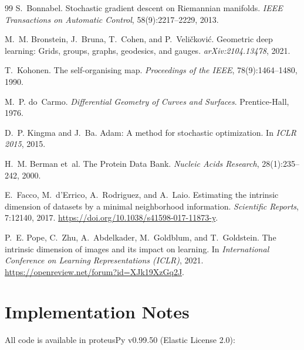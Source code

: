 \documentclass[12pt,letterpaper]{article}
\begin{document}
\begin{thebibliography}{99}
S.~Bonnabel.
\newblock Stochastic gradient descent on {Riemannian} manifolds.
\newblock \emph{IEEE Transactions on Automatic Control}, 58(9):2217--2229, 2013.

M.~M. Bronstein, J.~Bruna, T.~Cohen, and P.~Veli\v{c}kovi\'{c}.
\newblock Geometric deep learning: Grids, groups, graphs, geodesics, and
  gauges.
\newblock \emph{arXiv:2104.13478}, 2021.

T.~Kohonen.
\newblock The self-organising map.
\newblock \emph{Proceedings of the IEEE}, 78(9):1464--1480, 1990.

M.~P. do~Carmo.
\newblock \emph{Differential Geometry of Curves and Surfaces}.
\newblock Prentice-Hall, 1976.

D.~P. Kingma and J.~Ba.
\newblock Adam: A method for stochastic optimization.
\newblock In \emph{ICLR 2015}, 2015.

H.~M. Berman et~al.
\newblock The {Protein Data Bank}.
\newblock \emph{Nucleic Acids Research}, 28(1):235--242, 2000.

E.~Facco, M.~d'Errico, A.~Rodriguez, and A.~Laio.
\newblock Estimating the intrinsic dimension of datasets by a minimal
  neighborhood information.
\newblock \emph{Scientific Reports}, 7:12140, 2017.
\newblock \url{https://doi.org/10.1038/s41598-017-11873-y}.

P.~E. Pope, C.~Zhu, A.~Abdelkader, M.~Goldblum, and T.~Goldstein.
\newblock The intrinsic dimension of images and its impact on learning.
\newblock In \emph{International Conference on Learning Representations
  (ICLR)}, 2021.
\newblock \url{https://openreview.net/forum?id=XJk19XzGq2J}.

\end{thebibliography}

\appendix
\section{Implementation Notes}

All code is available in proteusPy v0.99.50 (Elastic License 2.0):
\end{document}
